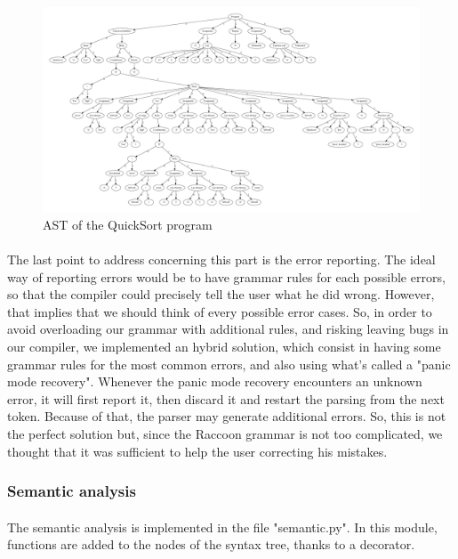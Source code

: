 \documentclass[12pt,a4paper]{article}
\begin{document}
\begin{figure}[ht]
    \center
    \includegraphics[scale=0.3, angle=90]{figures/QuickSort-ast.pdf}
    \caption{AST of the QuickSort program}
    \label{quicksort-ast}
\end{figure}

\paragraph{}
The last point to address concerning this part is the error reporting. The ideal way of reporting errors would be to have grammar rules for each possible errors, so that the compiler could precisely tell the user what he did wrong. However, that implies that we should think of every possible error cases. So, in order to avoid overloading our grammar with additional rules, and risking leaving bugs in our compiler, we implemented an hybrid solution, which consist in having some grammar rules for the most common errors, and also using what's called a "panic mode recovery". Whenever the panic mode recovery encounters an unknown error, it will first report it, then discard it and restart the parsing from the next token. Because of that, the parser may generate additional errors. So, this is not the perfect solution but, since the Raccoon grammar is not too complicated, we thought that it was sufficient to help the user correcting his mistakes.  

\subsubsection{Semantic analysis}

\paragraph{}
The semantic analysis is implemented in the file "semantic.py". In this module, functions are added to the nodes of the syntax tree, thanks to a decorator. 
\end{document}
